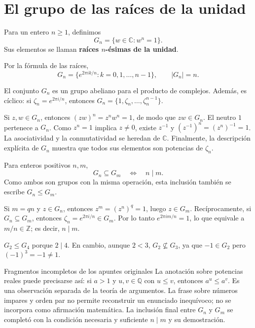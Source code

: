 \section{El grupo de las raíces de la unidad}
\begin{definicion}
Para un entero $n\geq1$, definimos
\[
G_n=\{w\in\mathbb C:w^n=1\}.
\]
Sus elementos se llaman \textbf{raíces $n$-ésimas de la unidad}.
\end{definicion}
Por la fórmula de las raíces,
\[
G_n=\{e^{2\pi ik/n}:k=0,1,\dots,n-1\},\qquad |G_n|=n.
\]

\begin{proposicion}
El conjunto $G_n$ es un grupo abeliano para el producto de complejos.
Además, es cíclico: si $\zeta_n=e^{2\pi i/n}$, entonces
$G_n=\{1,\zeta_n,\dots,\zeta_n^{n-1}\}$.
\end{proposicion}
\begin{demostracion}
Si $z,w\in G_n$, entonces $(zw)^n=z^nw^n=1$, de modo que
$zw\in G_n$. El neutro $1$ pertenece a $G_n$. Como $z^n=1$ implica
$z\neq0$, existe $z^{-1}$ y $(z^{-1})^n=(z^n)^{-1}=1$.
La asociatividad y la conmutatividad se heredan de $\mathbb C$.
Finalmente, la descripción explícita de $G_n$ muestra que todos sus
elementos son potencias de $\zeta_n$.
\end{demostracion}

\begin{proposicion}[{title={Inclusión entre grupos de raíces de la unidad}}]
Para enteros positivos $n,m$,
\[
G_n\subseteq G_m\quad\Longleftrightarrow\quad n\mid m.
\]
Como ambos son grupos con la misma operación, esta inclusión también
se escribe $G_n\leq G_m$.
\end{proposicion}
\begin{demostracion}
Si $m=qn$ y $z\in G_n$, entonces $z^m=(z^n)^q=1$, luego
$z\in G_m$. Recíprocamente, si $G_n\subseteq G_m$, entonces
$\zeta_n=e^{2\pi i/n}\in G_m$. Por lo tanto
$e^{2\pi im/n}=1$, lo que equivale a $m/n\in\mathbb Z$; es decir,
$n\mid m$.
\end{demostracion}
\begin{ejemplo}
$G_2\leq G_4$ porque $2\mid4$. En cambio, aunque $2<3$,
$G_2\nsubseteq G_3$, ya que $-1\in G_2$ pero $(-1)^3=-1\neq1$.
\end{ejemplo}

\begin{nota}{Fragmentos incompletos de los apuntes originales}
La anotación sobre potencias reales puede precisarse así: si $a>1$
y $u,v\in\mathbb Q$ con $u\leq v$, entonces $a^u\leq a^v$.
Es una observación separada de la teoría de argumentos.
La frase sobre números impares y orden par no permite reconstruir
un enunciado inequívoco; no se incorpora como afirmación matemática.
La inclusión final entre $G_n$ y $G_m$ se completó con la condición
necesaria y suficiente $n\mid m$ y su demostración.
\end{nota}
